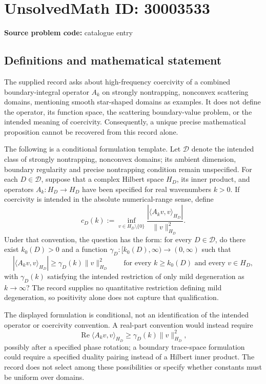 \documentclass[11pt]{article}
\begin{document}
\section*{UnsolvedMath ID: 30003533}
\textbf{Source problem code:} catalogue entry
\subsection{Definitions and mathematical statement}
The supplied record asks about high-frequency coercivity of a combined boundary-integral operator \(A_k\) on strongly nontrapping, nonconvex scattering domains, mentioning smooth star-shaped domains as examples. It does not define the operator, its function space, the scattering boundary-value problem, or the intended meaning of coercivity. Consequently, a unique precise mathematical proposition cannot be recovered from this record alone.

The following is a conditional formulation template. Let \(\mathcal D\) denote the intended class of strongly nontrapping, nonconvex domains; its ambient dimension, boundary regularity and precise nontrapping condition remain unspecified. For each \(D\in\mathcal D\), suppose that a complex Hilbert space \(H_D\), its inner product, and operators \(A_k:H_D\to H_D\) have been specified for real wavenumbers \(k>0\). If coercivity is intended in the absolute numerical-range sense, define
\[
 c_D(k):=\inf_{v\in H_D\setminus\{0\}}
 \frac{\left|\langle A_kv,v\rangle_{H_D}\right|}{\|v\|_{H_D}^{2}}.
\]
Under that convention, the question has the form: for every \(D\in\mathcal D\), do there exist \(k_0(D)>0\) and a function \(\gamma_D:[k_0(D),\infty)\to(0,\infty)\) such that
\[
 \left|\langle A_kv,v\rangle_{H_D}\right|
 \geq \gamma_D(k)\|v\|_{H_D}^{2}
 \qquad
 \text{for every }k\geq k_0(D)\text{ and every }v\in H_D,
\]
with \(\gamma_D(k)\) satisfying the intended restriction of only mild degeneration as \(k\to\infty\)? The record supplies no quantitative restriction defining mild degeneration, so positivity alone does not capture that qualification.

The displayed formulation is conditional, not an identification of the intended operator or coercivity convention. A real-part convention would instead require
\[
 \operatorname{Re}\langle A_kv,v\rangle_{H_D}
 \geq \gamma_D(k)\|v\|_{H_D}^{2},
\]
possibly after a specified phase rotation; a boundary trace-space formulation could require a specified duality pairing instead of a Hilbert inner product. The record does not select among these possibilities or specify whether constants must be uniform over domains.
\end{document}

